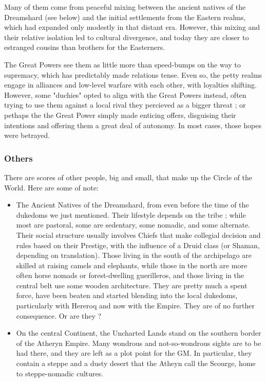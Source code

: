 Many of them come from peaceful mixing between the ancient natives of the Dreamshard (see below) and the initial settlements from the Eastern realms, which had expanded only modestly in that distant era. However, this mixing and their relative isolation led to cultural divergence, and today they are closer to estranged cousins than brothers for the Easterners.

The Great Powers see them as little more than speed-bumps on the way to supremacy, which has predictably made relations tense. Even so, the petty realms engage in alliances and low-level warfare with each other, with loyalties shifting. However, some "duchies" opted to align with the Great Powers instead, often trying to use them against a local rival they percieved as a bigger threat ; or pethaps the the Great Power simply made enticing offers, disguising their intentions and offering them a great deal of autonomy. In most cases, those hopes were betrayed.

\subsubsection{Others}

There are scores of other people, big and small, that make up the Circle of the World. Here are some of note:

\begin{itemize}
    \item The Ancient Natives of the Dreamshard, from even before the time of the dukedoms we just mentioned.
    Their lifestyle depends on the tribe ; while most are pastoral, some are sedentary, some nomadic, and some alternate. Their social structure usually involves Chiefs that make collegial decision and rules based on their Prestige, with the influence of a Druid class (or Shaman, depending on translation). Those living in the south of the archipelago are skilled at raising camels and elephants, while those in the north are more often horse nomads or forest-dwelling guerilleros, and those living in the central belt use some wooden architecture. They are pretty much a spent force, have been beaten and started blending into the local dukedoms, particularly with Hereroq and now with the Empire. They are of no further consequence. Or are they ?
    \item On the central Continent, the Uncharted Lands stand on the southern border of the Atheryn Empire. Many wondrous and not-so-wondrous sights are to be had there, and they are left as a plot point for the GM. In particular, they contain a steppe and a dusty desert that the Atheyn call the Scourge, home to steppe-nomadic cultures.
\end{itemize}

